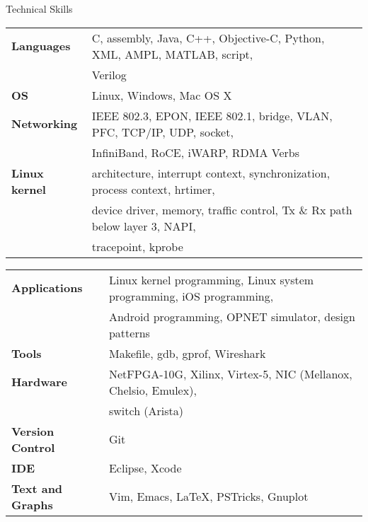 \documentclass{resume} %
\begin{document}
\begin{rSection}{Technical Skills}

\begin{tabular}{ @{} >{\bfseries}l @{\hspace{6ex}} l }
Languages & C, assembly, Java, C++, Objective-C, Python, XML, AMPL, MATLAB, script, \\
& Verilog \\
OS & Linux, Windows, Mac OS X \\
Networking & IEEE 802.3, EPON, IEEE 802.1, bridge, VLAN, PFC, TCP/IP, UDP, socket, \\
& InfiniBand, RoCE, iWARP, RDMA Verbs \\
Linux kernel & architecture, interrupt context, synchronization, process context, hrtimer, \\
& device driver, memory, traffic control, Tx \& Rx path below layer 3, NAPI, \\
& tracepoint, kprobe \\
\end{tabular}

\begin{tabular}{ @{} >{\bfseries}l @{\hspace{6ex}} l }
Applications & Linux kernel programming, Linux system programming, iOS programming, \\
& Android programming, OPNET simulator, design patterns \\
Tools & Makefile, gdb, gprof, Wireshark \\
Hardware & NetFPGA-10G, Xilinx, Virtex-5, NIC (Mellanox, Chelsio, Emulex), \\
& switch (Arista) \\
Version Control & Git \\
IDE & Eclipse, Xcode  \\
Text and Graphs & Vim, Emacs, \LaTeX, PSTricks, Gnuplot
\end{tabular}

\end{rSection}



\end{document}
